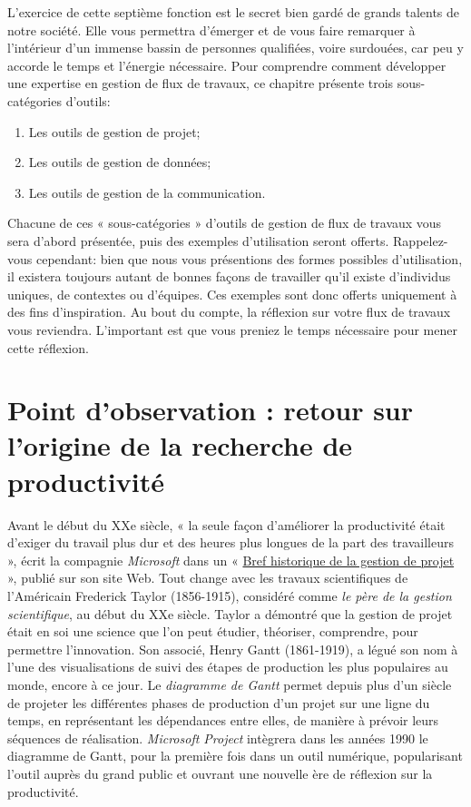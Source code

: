 \documentclass[
  letterpaper,
  DIV=11,
  numbers=noendperiod]{scrreprt}
\providecommand{\tightlist}{%
  \setlength{\itemsep}{0pt}\setlength{\parskip}{0pt}}\usepackage{longtable,booktabs,array}
\begin{document}
L'exercice de cette septième fonction est le secret bien gardé de grands
talents de notre société. Elle vous permettra d'émerger et de vous faire
remarquer à l'intérieur d'un immense bassin de personnes qualifiées,
voire surdouées, car peu y accorde le temps et l'énergie nécessaire.
Pour comprendre comment développer une expertise en gestion de flux de
travaux, ce chapitre présente trois sous-catégories d'outils:

\begin{enumerate}
\def\labelenumi{\arabic{enumi}.}
\tightlist
\item
  Les outils de gestion de projet;
\item
  Les outils de gestion de données;
\item
  Les outils de gestion de la communication.
\end{enumerate}

Chacune de ces « sous-catégories » d'outils de gestion de flux de
travaux vous sera d'abord présentée, puis des exemples d'utilisation
seront offerts. Rappelez-vous cependant: bien que nous vous présentions
des formes possibles d'utilisation, il existera toujours autant de
bonnes façons de travailler qu'il existe d'individus uniques, de
contextes ou d'équipes. Ces exemples sont donc offerts uniquement à des
fins d'inspiration. Au bout du compte, la réflexion sur votre flux de
travaux vous reviendra. L'important est que vous preniez le temps
nécessaire pour mener cette réflexion.

\section{Point d'observation : retour sur l'origine de la recherche de
productivité}\label{point-dobservation-retour-sur-lorigine-de-la-recherche-de-productivituxe9}

Avant le début du XXe siècle, « la seule façon d'améliorer la
productivité était d'exiger du travail plus dur et des heures plus
longues de la part des travailleurs », écrit la compagnie
\emph{Microsoft} dans un «
\href{https://support.microsoft.com/fr-fr/topic/bref-historique-de-la-gestion-de-projet-a2e0b717-094b-4d1e-878a-fcd0978891cd}{Bref
historique de la gestion de projet} », publié sur son site Web. Tout
change avec les travaux scientifiques de l'Américain Frederick Taylor
(1856-1915), considéré comme \emph{le père de la gestion scientifique},
au début du XXe siècle. Taylor a démontré que la gestion de projet était
en soi une science que l'on peut étudier, théoriser, comprendre, pour
permettre l'innovation. Son associé, Henry Gantt (1861-1919), a légué
son nom à l'une des visualisations de suivi des étapes de production les
plus populaires au monde, encore à ce jour. Le \emph{diagramme de Gantt}
permet depuis plus d'un siècle de projeter les différentes phases de
production d'un projet sur une ligne du temps, en représentant les
dépendances entre elles, de manière à prévoir leurs séquences de
réalisation. \emph{Microsoft Project} intègrera dans les années 1990 le
diagramme de Gantt, pour la première fois dans un outil numérique,
popularisant l'outil auprès du grand public et ouvrant une nouvelle ère
de réflexion sur la productivité.
\end{document}
